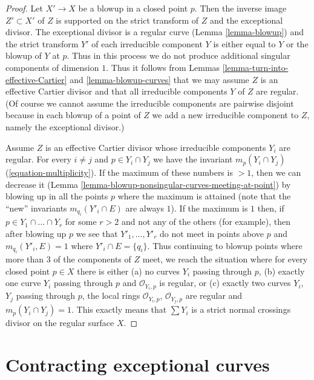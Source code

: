 \begin{proof}
Let $X' \to X$ be a blowup in a closed point $p$. Then the inverse image
$Z' \subset X'$ of $Z$ is supported on the strict transform of $Z$ and
the exceptional divisor. The exceptional divisor is a regular curve
(Lemma \ref{lemma-blowup}) and the strict transform $Y'$ of each irreducible
component $Y$ is either equal to $Y$ or the blowup of $Y$ at $p$.
Thus in this process we do not produce additional singular components
of dimension $1$. Thus it follows from
Lemmas \ref{lemma-turn-into-effective-Cartier} and \ref{lemma-blowup-curves}
that we may assume $Z$ is an effective Cartier divisor and
that all irreducible components $Y$ of $Z$ are regular.
(Of course we cannot assume the irreducible components are
pairwise disjoint because in each blowup of a point of $Z$
we add a new irreducible component to $Z$, namely the exceptional divisor.)

\medskip\noindent
Assume $Z$ is an effective Cartier divisor whose irreducible components
$Y_i$ are regular. For every $i \not = j$
and $p \in Y_i \cap Y_j$ we have the invariant
$m_p(Y_i \cap Y_j)$ (\ref{equation-multiplicity}).
If the maximum of these numbers is $> 1$, then we can decrease
it (Lemma \ref{lemma-blowup-nonsingular-curves-meeting-at-point})
by blowing up in all the points $p$ where the maximum is attained
(note that the ``new'' invariants $m_{q_i}(Y'_i \cap E)$ are always $1$).
If the maximum is $1$ then, if $p \in Y_1 \cap \ldots \cap Y_r$
for some $r > 2$ and not any of the others (for example), then after
blowing up $p$ we see that $Y'_1, \ldots, Y'_r$ do not meet in points
above $p$ and $m_{q_i}(Y'_i, E) = 1$ where $Y'_i \cap E = \{q_i\}$.
Thus continuing to blowup points where more than $3$
of the components of $Z$ meet, we reach the situation where
for every closed point $p \in X$ there is either
(a) no curves $Y_i$ passing through $p$,
(b) exactly one curve $Y_i$ passing through $p$ and $\mathcal{O}_{Y_i, p}$
is regular, or (c) exactly two curves $Y_i$, $Y_j$ passing through
$p$, the local rings $\mathcal{O}_{Y_i, p}$, $\mathcal{O}_{Y_j, p}$
are regular and $m_p(Y_i \cap Y_j) = 1$.
This exactly means that $\sum Y_i$ is a strict normal crossings
divisor on the regular surface $X$.
\end{proof}






\section{Contracting exceptional curves}
\label{section-minus-one}

